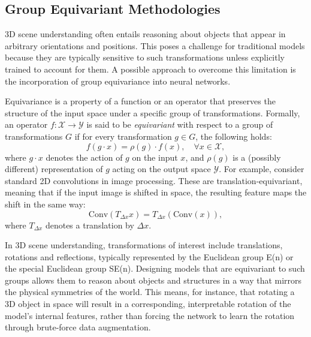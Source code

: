 \subsection{Group Equivariant Methodologies}

3D scene understanding often entails reasoning about objects that appear in arbitrary
orientations and positions. This poses a challenge for traditional models
because they are typically sensitive to such transformations unless explicitly
trained to account for them.
%
A possible approach to overcome this limitation is the incorporation of group
equivariance into neural networks.

Equivariance is a property of a function or an operator that preserves the structure of the
input space under a specific group of transformations.
%
Formally, an operator $f: \mathcal{X} \rightarrow \mathcal{Y}$ is said to be
\emph{equivariant} with respect to a group of transformations $G$ if for every
transformation $g \in G$, the following holds:
\begin{equation}\label{eq:equivariance}
    f(g \cdot x) = \rho(g) \cdot f(x), \quad \forall x \in \mathcal{X},
\end{equation}
%
where $g \cdot x$ denotes the action of $g$ on the input $x$, and $\rho(g)$ is
a (possibly different) representation of $g$ acting on the output space
$\mathcal{Y}$.
%
For example, consider standard 2D convolutions in image processing. These are
translation-equivariant, meaning that if the input image is shifted in space,
the resulting feature maps the shift in the same way:
\begin{equation}\label{eq:translation-equivariance}
    \text{Conv}(T_{\Delta x} x) = T_{\Delta x}(\text{Conv}(x)),
\end{equation}
where $T_{\Delta x}$ denotes a translation by $\Delta x$.

In 3D scene understanding, transformations of interest include translations,
rotations and reflections, typically represented by the Euclidean group E(n) or
the special Euclidean group SE(n).
%
Designing models that are equivariant to such groups allows them to reason
about objects and structures in a way that mirrors the physical symmetries of
the world. This means, for instance, that rotating a 3D object in space will
result in a corresponding, interpretable rotation of the model’s internal
features, rather than forcing the network to learn the rotation through
brute-force data augmentation.
%

